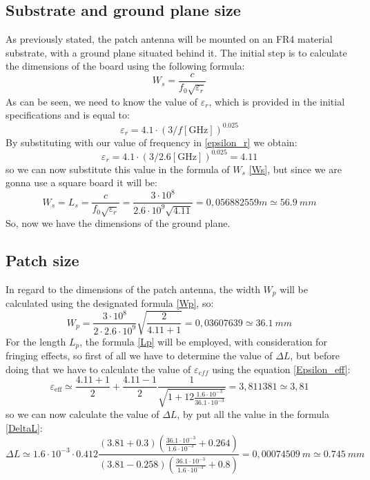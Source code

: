 \documentclass[]{article}
\begin{document}
	\subsection{Substrate and ground plane size}
	As previously stated, the patch antenna will be mounted on an FR4 material substrate, with a ground plane situated behind it. The initial step is to calculate the dimensions of the board using the following formula:
	\begin{equation}
		W_s=\frac{c}{f_0 \sqrt{\varepsilon_r}}
		\label{Ws}
	\end{equation}
	As can be seen, we need to know the value of $\varepsilon_r$, which is provided in the initial specifications and is equal to:
	\begin{equation}
		\varepsilon_r = 4.1 \cdot (3/f[\text{GHz}])^{0.025}
		\label{epsilon_r}
	\end{equation}
	By substituting with our value of frequency in \eqref{epsilon_r} we obtain: \[\varepsilon_r = 4.1 \cdot (3/2.6[\text{GHz}])^{0.025}=4.11\] 
	so we can now substitute this value in the formula of $W_s$ \eqref{Ws}, but since we are gonna use a square board it will be: \[W_s=L_s=\frac{c}{f_0 \sqrt{\varepsilon_r}}=\frac{3 \cdot 10^8}{2.6 \cdot 10^9\sqrt{4.11}}=0,056882559 m \simeq 56.9\ mm \]
So, now we have the dimensions of the ground plane.
\subsection{Patch size}
In regard to the dimensions of the patch antenna, the width $W_p$ will be calculated using the designated formula \eqref{Wp}, so: 
\[W_p=\frac{3 \cdot 10^8}{2 \cdot 2.6 \cdot 10^9}\sqrt{\frac{2}{4.11+1}}=0,03607639
 \simeq 36.1 \ mm\]
For the length $L_p$, the formula \eqref{Lp} will be employed, with consideration for fringing effects, so first of all we have to determine the value of $\Delta L$, but before doing that we have to calculate the value of $\varepsilon_{eff}$ using the equation \eqref{Epsilon_eff}:
\[\varepsilon_\text{eff} \simeq \frac{4.11 + 1}{2} + \frac{4.11 - 1}{2} \frac{1}{\sqrt{1 + 12 \frac{1.6 \cdot 10^{-3}}{36.1 \cdot 10^{-3}}}}=3,811381 \simeq 3,81\]
so we can now calculate the value of $\Delta L$, by put all the value in the formula \eqref{DeltaL}:
\[	\Delta L \simeq 1.6 \cdot 10^{-3} \cdot 0.412 \frac{\left( 3.81 + 0.3 \right) \left( \frac{36.1 \cdot 10^{-3}}{1.6\cdot 10^{-3}} + 0.264 \right)}{\left( 3.81 - 0.258 \right) \left( \frac{36.1\cdot 10^{-3}}{1.6 \cdot 10^{-3}} + 0.8 \right)} = 0,00074509
\ m \simeq 0.745 \ mm
\]
\end{document}
